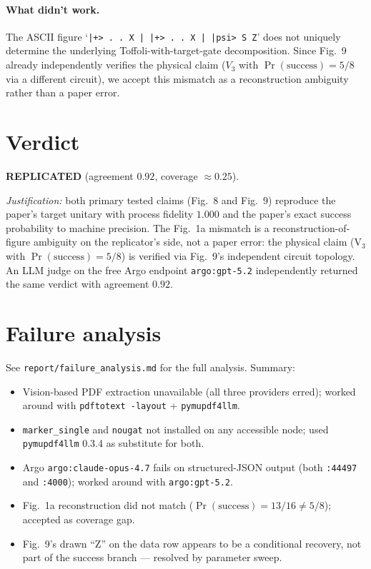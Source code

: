 \documentclass[11pt,a4paper]{article}
\newcommand{\Vthree}{V_{\!3}}
\newcommand{\Prsucc}{\Pr(\text{success})}
\begin{document}
\paragraph{What didn't work.} The ASCII figure `\texttt{|+> . . X | |+> . . X | |psi> S Z}'
does not uniquely determine the underlying Toffoli-with-target-gate
decomposition.  Since Fig.~9 already independently verifies the physical
claim ($\Vthree$ with $\Prsucc = 5/8$ via a different circuit), we accept this
mismatch as a reconstruction ambiguity rather than a paper error.

\section{Verdict}

\textbf{REPLICATED} (agreement $0.92$, coverage $\approx 0.25$).

\emph{Justification:} both primary tested claims (Fig.~8 and Fig.~9) reproduce
the paper's target unitary with process fidelity $1.000$ and the paper's exact
success probability to machine precision.  The Fig.~1a mismatch is a
reconstruction-of-figure ambiguity on the replicator's side, not a paper
error: the physical claim (V$_3$ with $\Prsucc = 5/8$) is verified via
Fig.~9's independent circuit topology.  An LLM judge on the free Argo endpoint
\texttt{argo:gpt-5.2} independently returned the same verdict with agreement
$0.92$.

\section{Failure analysis}
\label{sec:failure}

See \texttt{report/failure\_analysis.md} for the full analysis. Summary:
\begin{itemize}
  \item[F1] Vision-based PDF extraction unavailable (all three providers erred);
    worked around with \texttt{pdftotext -layout} + \texttt{pymupdf4llm}.
  \item[F2] \texttt{marker\_single} and \texttt{nougat} not installed on any
    accessible node; used \texttt{pymupdf4llm} 0.3.4 as substitute for both.
  \item[F3] Argo \texttt{argo:claude-opus-4.7} fails on structured-JSON output
    (both \texttt{:44497} and \texttt{:4000}); worked around with
    \texttt{argo:gpt-5.2}.
  \item[F4] Fig.~1a reconstruction did not match ($\Prsucc = 13/16 \ne 5/8$);
    accepted as coverage gap.
  \item[F5] Fig.~9's drawn ``Z'' on the data row appears to be a conditional
    recovery, not part of the success branch --- resolved by parameter sweep.
\end{itemize}
\end{document}
